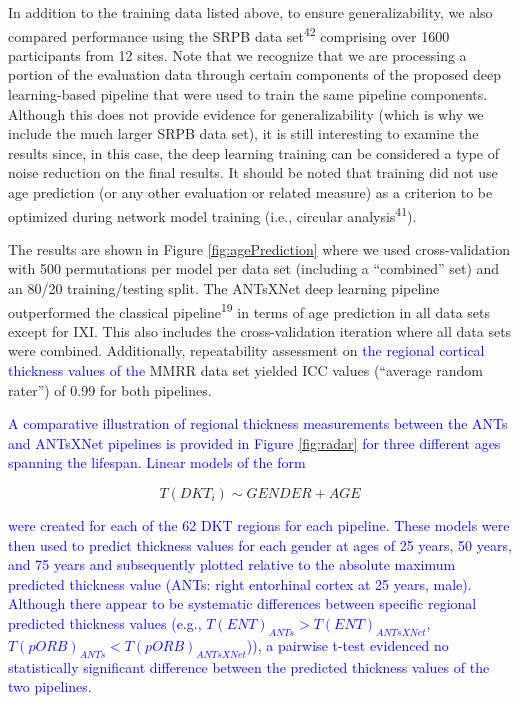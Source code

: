 \documentclass[12pt,]{article}
\begin{document}
In addition to the training data listed above, to ensure
generalizability, we also compared performance using the SRPB data
set\textsuperscript{42} comprising over 1600 participants from 12 sites.
Note that we recognize that we are processing a portion of the
evaluation data through certain components of the proposed deep
learning-based pipeline that were used to train the same pipeline
components. Although this does not provide evidence for generalizability
(which is why we include the much larger SRPB data set), it is still
interesting to examine the results since, in this case, the deep
learning training can be considered a type of noise reduction on the
final results. It should be noted that training did not use age
prediction (or any other evaluation or related measure) as a criterion
to be optimized during network model training (i.e., circular
analysis\textsuperscript{41}).

The results are shown in Figure \ref{fig:agePrediction} where we used
cross-validation with 500 permutations per model per data set (including
a ``combined'' set) and an 80/20 training/testing split. The ANTsXNet
deep learning pipeline outperformed the classical
pipeline\textsuperscript{19} in terms of age prediction in all data sets
except for IXI. This also includes the cross-validation iteration where
all data sets were combined. Additionally, repeatability assessment on
\textcolor{blue}{the regional cortical thickness
values of the} MMRR data set yielded ICC values (``average random
rater'') of 0.99 for both pipelines.

\textcolor{blue}{
A comparative illustration of regional thickness measurements between the ANTs
and ANTsXNet pipelines is provided in Figure \ref{fig:radar} for three different
ages spanning the lifespan.  Linear models of the form}

\begin{equation}
  T(DKT_i) \sim GENDER + AGE
\end{equation}

\textcolor{blue}{
were created for each of the 62 DKT regions for each pipeline.  These models were
then used to predict thickness values for each gender at ages of 25 years, 50 years,
and 75 years and subsequently plotted relative to the absolute maximum predicted
thickness value (ANTs:  right entorhinal cortex at 25 years, male).  Although
there appear to be systematic differences between specific regional predicted
thickness values (e.g., $T(ENT)_{ANTs} > T(ENT)_{ANTsXNet}$,
$T(pORB)_{ANTs} < T(pORB)_{ANTsXNet}$)), a pairwise t-test evidenced no statistically
significant difference between the predicted thickness values of the two pipelines.}
\end{document}
